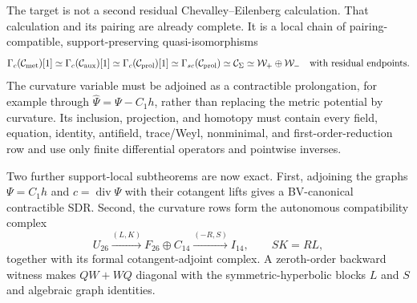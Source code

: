 \documentclass[11pt]{article}
\theoremstyle{definition}
\theoremstyle{remark}
\begin{document}
The target is not a second residual Chevalley--Eilenberg calculation.  That
calculation and its pairing are already complete.  It is a local chain of
pairing-compatible, support-preserving quasi-isomorphisms
\begin{equation}\label{eq:covariant-causal-bridge}
 \Gamma_c(\mathcal C_{\rm met})[1]
 \simeq\Gamma_c(\mathcal C_{\rm aux})[1]
 \simeq\Gamma_c(\mathcal C_{\rm prol})[1]
 \simeq\Gamma_{sc}(\mathcal C_{\rm prol})
 \simeq\mathcal C_\Sigma
 \simeq\mathcal W_+\oplus\mathcal W_-
 \quad\text{with residual endpoints}.
\end{equation}
The curvature variable must be adjoined as a contractible prolongation,
for example through $\widehat\Psi=\Psi-C_1h$, rather than replacing the
metric potential by curvature.  Its inclusion, projection, and homotopy
must contain every field, equation, identity, antifield, trace/Weyl,
nonminimal, and first-order-reduction row and use only finite differential
operators and pointwise inverses.

Two further support-local subtheorems are now exact.  First, adjoining the
graphs $\Psi=C_1h$ and $c=\operatorname{div}\Psi$ with their cotangent lifts
gives a BV-canonical contractible SDR.  Second, the curvature rows form the
autonomous compatibility complex
\begin{equation}
 U_{26}\xrightarrow{(L,K)}F_{26}\oplus C_{14}
 \xrightarrow{(-R,S)}I_{14},
 \qquad SK=RL,
\end{equation}
together with its formal cotangent-adjoint complex.  A zeroth-order backward
witness makes $QW+WQ$ diagonal with the symmetric-hyperbolic blocks $L$ and
$S$ and algebraic graph identities.
\end{document}
